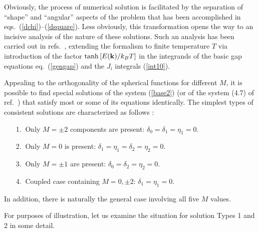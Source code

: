 Obviously, the process of numerical solution is facilitated by the
separation of ``shape'' and ``angular'' aspects of the problem that has 
been accomplished in eqs.~(\ref{dchi})--(\ref{dsquare}).  Less obviously,
this transformation opens the way to an incisive analysis of the nature
of these solutions.  Such an analysis has been carried out in
refs.~\cite{univ,van}, extending the formalism to finite temperature
$T$ via introduction of the factor $\tanh\left[E({\bf k})/k_B T\right]$
in the integrands of the basic gap equations eq.~(\ref{gengap}) and
the $J_i$ integrals (\ref{int10}).

Appealing to the orthogonality of the spherical functions for different
$M$, it is possible to find special solutions of the system (\ref{base2})
(or of the system (4.7) of ref.~\cite{ostgaard}) that satisfy most or
some of its equations identically.  The simplest types of consistent
solutions are characterized as follows \cite{tt71,ttr,ostgaard}:
\begin{enumerate}
\item[1.$~$] Only $M = \pm 2$ components are present:
$\delta_0=\delta_1=\eta_1=0$.
\item[2.$~$] Only $M = 0$ is present:
	$\delta_1=\eta_1=\delta_2=\eta_2=0$.
\item[3.$~$] Only $M = \pm 1$ are present:
	$\delta_0=\delta_2=\eta_2=0$.
\item[4.$~$] Coupled case containing $M = 0, \pm 2$:
	$\delta_1=\eta_1=0$.
\end{enumerate}
\noindent
In addition, there is naturally the general case involving all five 
$M$ values.

For purposes of illustration, let us examine the situation
for solution Types 1 and 2 in some detail.

